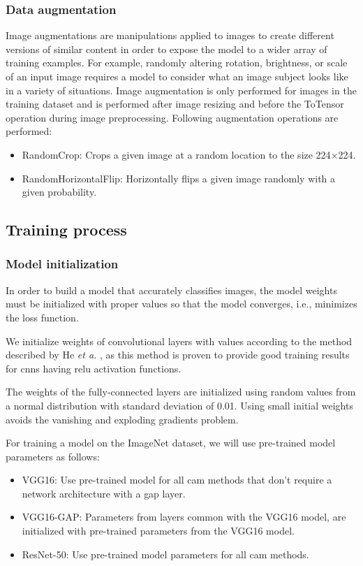 \subsubsection{Data augmentation} \label{sec:training_augmentation}
Image augmentations are manipulations applied to images to create different versions of similar content in order to expose the model to a wider array of training examples. For example, randomly altering rotation, brightness, or scale of an input image requires a model to consider what an image subject looks like in a variety of situations. Image augmentation is only performed for images in the training dataset and is performed after image resizing and before the ToTensor operation during image preprocessing. Following augmentation operations are performed:
\begin{itemize}
    \item RandomCrop: Crops a given image at a random location to the size 224$\times$224.
    \item RandomHorizontalFlip: Horizontally flips a given image randomly with a given probability.
\end{itemize}

\subsection{Training process}
\subsubsection{Model initialization}
In order to build a model that accurately classifies images, the model weights must be initialized with proper values so that the model converges, i.e., minimizes the loss function.

We initialize weights of convolutional layers with values according to the method described by He \textit{et a.} \cite{he2015delving}, as this method is proven to provide good training results for \acrshort{cnn}s having \acrshort{relu} activation functions.

The weights of the fully-connected layers are initialized using random values from a normal distribution with standard deviation of 0.01. Using small initial weights avoids the vanishing and exploding gradients problem.

For training a model on the ImageNet dataset, we will use pre-trained model parameters as follows:
\begin{itemize}
    \item VGG16: Use pre-trained model for all \acrshort{cam} methods that don't require a network architecture with a \acrshort{gap} layer.
    \item VGG16-GAP: Parameters from layers common with the VGG16 model, are initialized with pre-trained parameters from the VGG16 model.
    \item ResNet-50: Use pre-trained model parameters for all \acrshort{cam} methods.
\end{itemize}


